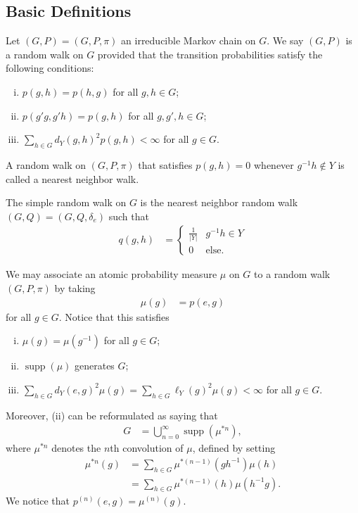 \documentclass[10pt]{mypackage}
\begin{document}
\subsection{Basic Definitions}%
\begin{definition}
  Let $\left( G,P \right) = \left( G,P,\pi \right)$ an irreducible Markov chain on $G$. We say $\left( G,P \right)$ is a random walk on $G$ provided that the transition probabilities satisfy the following conditions:
  \begin{enumerate}[(i)]
    \item $p\left( g,h \right) = p\left( h,g \right)$ for all $g,h\in G$;
    \item $p\left( g'g,g'h \right) = p\left( g,h \right)$ for all $g,g',h\in G$;
    \item $\sum_{h\in G}d_Y\left( g,h \right)^2p\left( g,h \right) < \infty$ for all $g\in G$.
  \end{enumerate}
  A random walk on $\left( G,P,\pi \right)$ that satisfies $p\left( g,h \right) = 0$ whenever $g^{-1}h\notin Y$ is called a nearest neighbor walk.
\end{definition}
\begin{example}
  The simple random walk on $G$ is the nearest neighbor random walk $\left( G,Q \right) = \left( G,Q,\delta_{e} \right)$ such that
  \begin{align*}
    q\left( g,h \right) &= \begin{cases}
      \frac{1}{\left\vert Y \right\vert} & g^{-1}h\in Y\\
      0 & \text{else}.
    \end{cases}
  \end{align*}
\end{example}
We may associate an atomic probability measure $\mu$ on $G$ to a random walk $\left( G,P,\pi \right)$ by taking
\begin{align*}
  \mu\left( g \right) &= p\left( e,g \right)
\end{align*}
for all $g\in G$. Notice that this satisfies
\begin{enumerate}[(i)]
  \item $\mu\left( g \right) = \mu\left( g^{-1} \right)$ for all $g\in G$;
  \item $\operatorname{supp}\left( \mu \right)$ generates $G$;
  \item $\sum_{h\in G}d_Y\left( e,g \right)^2\mu(g) = \sum_{h\in G} \ell_Y(g)^2\mu(g) < \infty$ for all $g\in G$.
\end{enumerate}
Moreover, (ii) can be reformulated as saying that
\begin{align*}
  G &= \bigcup_{n=0}^{\infty} \operatorname{supp}\left( \mu^{\ast n} \right),
\end{align*}
where $\mu^{\ast n}$ denotes the $n$th convolution of $\mu$, defined by setting
\begin{align*}
  \mu^{\ast n}(g) &= \sum_{h\in G}\mu^{\ast\left( n-1 \right)}\left( gh^{-1} \right)\mu\left( h \right)\\
                  &= \sum_{h\in G}\mu^{\ast\left( n-1 \right)}\left( h \right)\mu\left( h^{-1}g \right).
\end{align*}
We notice that $p^{(n)}\left( e,g \right) = \mu^{(n)}(g)$.
\end{document}
